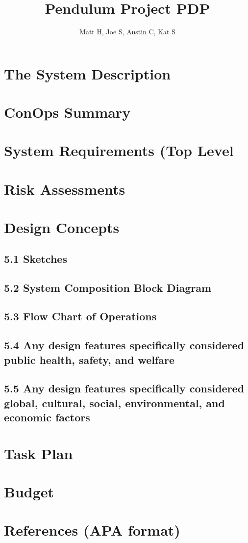 \documentclass[a4paper,10pt]{article}
\title{Pendulum Project PDP}
\author{Matt H, Joe S, Austin C, Kat S}
\begin{document}
\maketitle

\tableofcontents


\section{The System Description}

\section{ConOps Summary}
    
\section{System Requirements (Top Level}

\section{Risk Assessments}

\section{Design Concepts}
    \subsection{5.1	Sketches}
    \subsection{5.2	System Composition Block Diagram}
    \subsection{5.3	Flow Chart of Operations}
    \subsection{5.4	Any design features specifically  considered public health, safety, and welfare}
    \subsection{5.5	Any design features specifically  considered global, cultural, social, environmental, and economic factors}
\section{Task Plan}

\section{Budget}

\section{References (APA format)}
\end{document}
